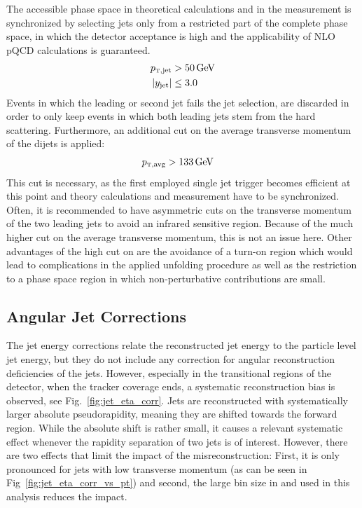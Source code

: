 The accessible phase space in theoretical calculations and in the measurement is
synchronized by selecting jets only from a restricted part of the complete phase
space, in which the detector acceptance is high and the applicability of NLO
pQCD calculations is guaranteed.
%
\begin{align*}
    \ptjet &> \SI{50}{\GeV}\\
    |y_\mathrm{jet}| &\leq 3.0\\
\end{align*}
%
Events in which the leading or second jet fails the jet selection, are
discarded in order to only keep events in which both leading jets stem
from the hard scattering. Furthermore, an additional cut on the
average transverse momentum of the dijets is applied:
%
\begin{align*}
    \ptavg &> \SI{133}{\GeV}
\end{align*}
%
This cut is necessary, as the first employed single jet trigger becomes
efficient at this point and theory calculations and measurement have to be
synchronized. Often, it is recommended to have asymmetric cuts on the
transverse momentum of the two leading jets to avoid an infrared sensitive
region. Because of the much higher cut on the average transverse momentum, this
is not an issue here. Other advantages of the high cut on \ptavg are the
avoidance of a turn-on region which would lead to complications in the applied
unfolding procedure as well as the restriction to a phase space region in which
non-perturbative contributions are small.

\subsection{Angular Jet Corrections}

The jet energy corrections relate the reconstructed jet energy to the particle
level jet energy, but they do not include any correction for angular
reconstruction deficiencies of the jets. However, especially in the transitional
regions of the detector, \ie when the tracker coverage ends, a systematic
reconstruction bias is observed, see Fig.~\ref{fig:jet_eta_corr}. Jets are
reconstructed with systematically larger absolute pseudorapidity, meaning they
are shifted towards the forward region. While the absolute shift is rather
small, it causes a relevant systematic effect whenever the rapidity separation
of two jets is of interest. However, there are two effects that limit the impact of the
misreconstruction: First, it is only pronounced for jets with low transverse momentum
(as can be seen in Fig~\ref{fig:jet_eta_corr_vs_pt}) and second, the large bin
size in \ystar and \yboost used in this analysis reduces the impact. 

